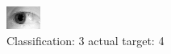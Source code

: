\begin{figure}[h!]
\begin{center}
\includegraphics[width=0.60\columnwidth]{figures/ID1229_class_3_target_4.png}
\end{center}
\caption{ Classification: 3 actual target: 4}
\label{fig:ID1229_class_3_target_4}
\end{figure}
